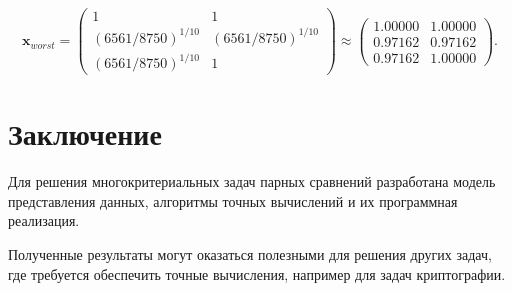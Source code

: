 \documentclass{spisok-article}
\begin{document}
$$\bm{x}_{worst} =
\begin{pmatrix}
1 & 1\\
(6561/8750)^{1/10} & (6561/8750)^{1/10}\\
(6561/8750)^{1/10} & 1
\end{pmatrix} \approx
\begin{pmatrix}
1.00000 & 1.00000\\
0.97162 & 0.97162\\
0.97162 & 1.00000
\end{pmatrix}.
$$


    \section{Заключение}
		Для решения многокритериальных задач парных сравнений разработана модель представления данных, алгоритмы точных вычислений и их программная реализация. 
			
    Полученные результаты могут оказаться полезными для решения других задач, где требуется обеспечить точные вычисления, например для задач криптографии. 





\end{document}
